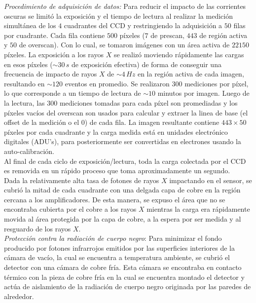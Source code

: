 {\indent \textit{Procedimiento de adquisición de datos:} Para reducir el impacto de las corrientes oscuras se limitó la exposición y el tiempo de lectura al realizar la medición simultánea de los $4$ cuadrantes del CCD y restringiendo la adquisición a $50$ filas por cuadrante. Cada fila contiene $500$ píxeles ($7$ de prescan, $443$ de región activa y $50$ de overscan). Con lo cual, se tomaron imágenes con un área activa de $22150$ píxeles. La exposición a los rayos $X$ se realizó moviendo rápidamente las cargas en esos píxeles ($\sim 30\,\si{s}$ de exposición efectiva) de forma de conseguir una frecuencia de impacto de rayos $X$ de $\sim 4\,\si{Hz}$ en la región activa de cada imagen, resultando en $\sim 120$ eventos en promedio. Se realizaron $300$ mediciones por píxel, lo que corresponde a un tiempo de lectura de $\sim 10$ minutos por imagen. Luego de la lectura, las $300$ mediciones tomadas para cada píxel son promediadas y los píxeles vacíos del overscan son usados para calcular y extraer la linea de base (el offset de la medición o el $0$) de cada fila. La imagen resultante contiene $443 \times 50$ píxeles por cada cuadrante y la carga medida está en unidades electrónico digitales (ADU's), para posteriormente ser convertidas en electrones usando la auto-calibración.\\
\indent Al final de cada ciclo de exposición/lectura, toda la carga colectada por el CCD es removida en un rápido proceso que toma aproximadamente un segundo.\\
\indent Dada la relativamente alta tasa de fotones de rayos $X$ impactando en el sensor, se cubrió la mitad de cada cuadrante con una delgada capa de cobre en la región cercana a los amplificadores. De esta manera, se expuso el área que no se encontraba cubierta por el cobre a los rayos $X$ mientras la carga era rápidamente movida al área protegida por la capa de cobre, a la espera por ser medida y al resguardo de los rayos $X$.\\
\textit{Protección contra la radiación de cuerpo negro}: Para minimizar el fondo producido por fotones infrarrojos emitidos por las superficies interiores de la cámara de vacío, la cual se encuentra a temperatura ambiente, se cubrió el detector con una cámara de cobre fría. Esta cámara se encontraba en contacto térmico con la pieza de cobre fría en la cual se encuentra montado el detector y actúa de aislamiento de la radiación de cuerpo negro originada por las paredes de alrededor.\\
}
